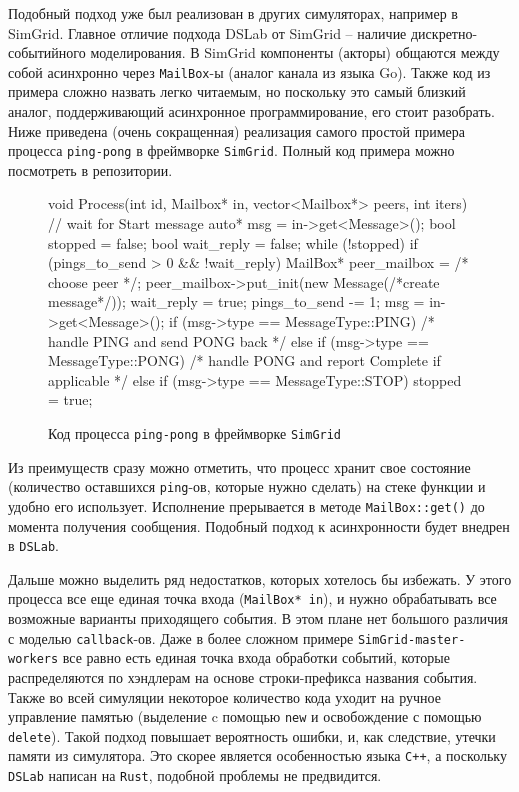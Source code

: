 Подобный подход уже был реализован в других симуляторах, например в SimGrid\cite{simgrid-article}. Главное отличие подхода DSLab от SimGrid -- наличие дискретно-событийного моделирования. В SimGrid компоненты (акторы) общаются между собой асинхронно через \texttt{MailBox}-ы (аналог канала из языка Go). Также код из примера сложно назвать легко читаемым, но поскольку это самый близкий аналог, поддерживающий асинхронное программирование, его стоит разобрать. Ниже приведена (очень сокращенная) реализация самого простой примера процесса \texttt{ping-pong} в фреймворке \texttt{SimGrid}. Полный код примера можно посмотреть в репозитории\cite{simgrid-example}.
\begin{figure}[H]
    \centering
    \small
\begin{cppcode}
void Process(int id, Mailbox* in, vector<Mailbox*> peers, int iters) {
    // wait for Start message
    auto* msg = in->get<Message>();
    bool stopped = false;
    bool wait_reply = false;
    while (!stopped) {
        if (pings_to_send > 0 && !wait_reply) {
            MailBox* peer_mailbox = /* choose peer */;
            peer_mailbox->put_init(new Message(/*create message*/));
            wait_reply = true;
            pings_to_send -= 1;
        }
        msg = in->get<Message>();
        if (msg->type == MessageType::PING) {
            /* handle PING and send PONG back */
        } else if (msg->type == MessageType::PONG) {
            /* handle PONG and report Complete if applicable */
        } else if (msg->type == MessageType::STOP) {
            stopped = true;
        }
    }
}
\end{cppcode}
\caption{Код процесса \texttt{ping-pong} в фреймворке \texttt{SimGrid}}
\label{simgridcode}
\end{figure}

Из преимуществ сразу можно отметить, что процесс хранит свое состояние (количество оставшихся \texttt{ping}-ов, которые нужно сделать) на стеке функции и удобно его использует. Исполнение прерывается в методе \texttt{MailBox::get()} до момента получения сообщения. Подобный подход к асинхронности будет внедрен в \texttt{DSLab}.

Дальше можно выделить ряд недостатков, которых хотелось бы избежать. У этого процесса все еще единая точка входа (\texttt{MailBox* in}), и нужно обрабатывать все возможные варианты приходящего события. В этом плане нет большого различия с моделью \texttt{callback}-ов. Даже в более сложном примере \texttt{SimGrid-master-workers}\cite{simgrid-master-workers} все равно есть единая точка входа обработки событий, которые распределяются по хэндлерам на основе строки-префикса названия события.   
Также во всей симуляции некоторое количество кода уходит на ручное управление памятью (выделение c помощью \texttt{new} и освобождение с помощью \texttt{delete}). Такой подход повышает вероятность ошибки, и, как следствие, утечки памяти из симулятора. Это скорее является особенностью языка \texttt{C++}, а поскольку \texttt{DSLab} написан на \texttt{Rust}, подобной проблемы не предвидится.  



